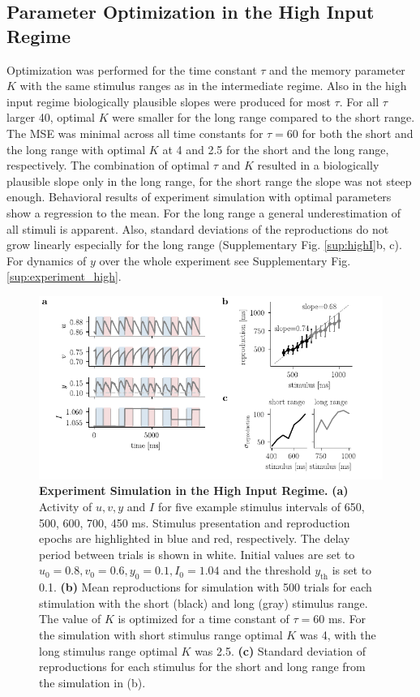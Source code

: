 \documentclass[10pt]{article}
\begin{document}
\subsection{Parameter Optimization in the High Input Regime}
Optimization was performed for the time constant $\tau$ and the memory parameter $K$ with the same stimulus ranges as in the intermediate regime. 
Also in the high input regime biologically plausible slopes were produced for most $\tau$. 
For all $\tau$ larger 40, optimal $K$ were smaller for the long range compared to the short range.
The MSE was minimal across all time constants for $\tau = 60$ for both the short and the long range with optimal $K$ at  4 and 2.5 for the short and the long range, respectively. The combination of optimal $\tau$ and $K$ resulted in a biologically plausible slope only in the long range, for the short range the slope was not steep enough. 
Behavioral results of experiment simulation with optimal parameters show a regression to the mean. For the long range a general underestimation of all stimuli is apparent. Also, standard deviations of the reproductions do not grow linearly especially for the long range (Supplementary Fig. \ref{sup:highI}b, c).
For dynamics of $y$ over the whole experiment see Supplementary Fig. \ref{sup:experiment_high}.

\begin{figure}[ht]
	\centering
	\includegraphics{figures/highI.pdf}
	\caption{\textbf{Experiment Simulation in the High Input Regime.} 
	\textbf{(a)} Activity of $u, v, y$ and $I$ for five example stimulus intervals of 650, 500, 600, 700, 450 ms. Stimulus presentation and reproduction epochs are highlighted in blue and red, respectively. The delay period between trials is shown in white. Initial values are set to $u_0=0.8 , v_0=0.6 , y_0=0.1, I_0=1.04$ and the threshold $y_{\text{th}}$ is set to 0.1. 
	\textbf{(b)} Mean reproductions for simulation with 500 trials for each stimulation with the short (black) and long (gray) stimulus range. The value of $K$ is optimized for a time constant of $\tau = 60$ ms. For the simulation with short
	stimulus range optimal $K$ was 4, with the long stimulus range optimal $K$ was 2.5.
	\textbf{(c)} Standard deviation of reproductions for each stimulus for the short and long range from the simulation in (b).
	}
\label{highI}
\end{figure}
\end{document}

